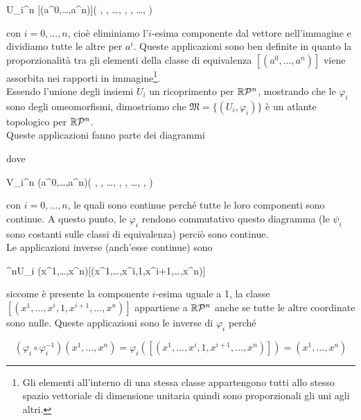 	{U_{i}}{\R^{n}}
	{[(a^{0},\dots,a^{n})]}{\left( , , \dots, , , \dots,  \right)}

con $ i=0,\dots,n $, cioè eliminiamo l'$ i $-esima componente dal vettore nell'immagine e dividiamo tutte le altre per $ a^{i} $. Queste applicazioni sono ben definite in quanto la proporzionalità tra gli elementi della classe di equivalenza $ [(a^{0},\dots,a^{n})] $ viene assorbita nei rapporti in immagine\footnote{%
	Gli elementi all'interno di una stessa classe appartengono tutti allo stesso spazio vettoriale di dimensione unitaria quindi sono proporzionali gli uni agli altri.%
}. \\
Essendo l'unione degli insiemi $ U_{i} $ un ricoprimento per $ \mathbb{R}\mathcal{P}^{n} $, mostrando che le $ \varphi_{i} $ sono degli omeomorfismi, dimostriamo che $ \mathfrak{M} = \{(U_{i},\varphi_{i})\} $ è un atlante topologico per $ \mathbb{R}\mathcal{P}^{n} $. \\
Queste applicazioni fanno parte dei diagrammi


dove

	{V_{i}}{\R^{n}}
	{(a^{0},\dots,a^{n})}{\left( , , \dots, , , \dots, , \right)}

con $ i=0,\dots,n $, le quali sono continue perché tutte le loro componenti sono continue. A questo punto, le $ \varphi_{i} $ rendono commutativo questo diagramma (le $ \psi_{i} $ sono costanti sulle classi di equivalenza) perciò sono continue. \\
Le applicazioni inverse (anch'esse continue) sono

	{\R^{n}}{U_{i}}
	{(x^{1},\dots,x^{n})}{[(x^{1},\dots,x^{i},1,x^{i+1},\dots,x^{n})]}

siccome è presente la componente $ i $-esima uguale a 1, la classe $ [(x^{1},\dots,x^{i},1,x^{i+1},\dots,x^{n})] $ appartiene a $ \mathbb{R}\mathcal{P}^{n} $ anche se tutte le altre coordinate sono nulle. Queste applicazioni sono le inverse di $ \varphi_{i} $ perché

\begin{equation}
		(\varphi_{i} \circ \varphi_{i}^{-1})(x^{1},\dots,x^{n}) = \varphi_{i}([(x^{1},\dots,x^{i},1,x^{i+1},\dots,x^{n})]) %
		= (x^{1},\dots,x^{n})
\end{equation}

